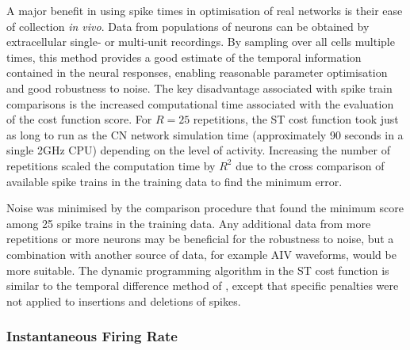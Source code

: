 \smallskip{}

A major benefit in using spike times in optimisation of real networks is their
ease of collection \textit{in vivo}. Data from populations of neurons can be
obtained by extracellular single- or multi-unit recordings.  By sampling over
all cells multiple times, this method provides a good estimate of the temporal
information contained in the neural responses, enabling reasonable parameter
optimisation and good robustness to noise.  The key disadvantage associated with
spike train comparisons is the increased computational time associated with the
evaluation of the cost function score.  For $R=25$ repetitions, the ST cost
function took just as long to run as the CN network simulation time
(approximately 90 seconds in a single 2GHz CPU) depending on the level of
activity. Increasing the number of repetitions scaled the computation time by
$R^2$ due to the cross comparison of available spike trains in the training data
to find the minimum error.

\smallskip{}

Noise was minimised by the comparison procedure that found the minimum score
among 25 spike trains in the training data. Any additional data from more
repetitions or more neurons may be beneficial for the robustness to noise, but a
combination with another source of data, for example AIV waveforms, would be
more suitable. The dynamic programming algorithm in the ST cost function is
similar to the temporal difference method of \citet{VictorGoldbergEtAl:2007},
except that specific penalties were not applied to insertions and deletions of
spikes.


\subsubsection{Instantaneous Firing Rate }\label{sec:GA:inst-firing-rate-summ}

